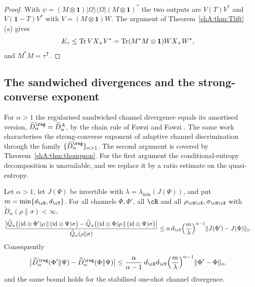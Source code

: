 \begin{proof}
With $\psi=(M\otimes\mathbf 1)|\Omega\rangle\langle\Omega|(M\otimes\mathbf 1)^*$ the two outputs are $V(T)V^*$ and $V(\mathbf 1-T)V^*$ with $V=(M\otimes\mathbf 1)W$. The argument of Theorem~\ref{shA:thm:Tlift}(a) gives
\[
E_\gamma\le\operatorname{Tr} VX_+V^*=\operatorname{Tr}(M^*M\otimes\mathbf 1)WX_+W^*,
\]
and $M^*M=\tau^{\mathsf T}$.
\end{proof}

\subsection*{The sandwiched divergences and the strong-converse exponent}

For $\alpha>1$ the regularised sandwiched channel divergence equals its amortised version, $\widetilde D^\reg_\alpha=\widetilde D^A_\alpha$, by the chain rule of Fawzi and Fawzi \cite[Corollary~5.2]{FawziFawzi2021}. The same work characterises the strong-converse exponent of adaptive channel discrimination through the family $\{\widetilde D^\reg_\alpha\}_{\alpha>1}$. The second argument is covered by Theorem~\ref{shA:thm:thompson}. For the first argument the conditional-entropy decomposition is unavailable, and we replace it by a ratio estimate on the quasi-entropy.

\begin{theorem}\label{shA:thm:sandfirst}
Let $\alpha>1$, let $J(\Psi)$ be invertible with $\lambda=\lambda_{\min}(J(\Psi))$, and put $m=\min\{d_\cX,d_\cY\}$. For all channels $\Phi,\Phi'$, all $\cR$ and all $\rho_{\cR\cX},\sigma_{\cR\cX}$ with $\widetilde D_\alpha(\rho\|\sigma)<\infty$,
\[
\frac{\big|\widetilde Q_\alpha\big((\id\otimes\Phi')\rho\,\|\,(\id\otimes\Psi)\sigma\big)-\widetilde Q_\alpha\big((\id\otimes\Phi)\rho\,\|\,(\id\otimes\Psi)\sigma\big)\big|}{\widetilde Q_\alpha(\rho\|\sigma)}\le\alpha\,d_\cY\Big(\frac m\lambda\Big)^{\alpha-1}\|J(\Phi')-J(\Phi)\|_1 .
\]
Consequently
\[
\big|\widetilde D^\reg_\alpha(\Phi'\|\Psi)-\widetilde D^\reg_\alpha(\Phi\|\Psi)\big|\le\frac{\alpha}{\alpha-1}\,d_\cX d_\cY\Big(\frac m\lambda\Big)^{\alpha-1}\|\Phi'-\Phi\|_\diamond ,
\]
and the same bound holds for the stabilised one-shot channel divergence.
\end{theorem}

